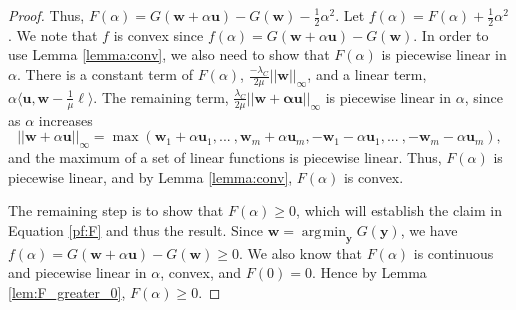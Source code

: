 \documentclass[10pt,a4paper]{amsart}
\DeclareMathOperator*{\argmin}{\arg\!\min}
\begin{document}
\begin{proof}
\noindent Thus, $F(\alpha) = G(\mathbf{w} + \alpha \mathbf{u}) - G(\mathbf{w}) - \frac{1}{2}\alpha^2$.  Let  $f(\alpha) = F(\alpha) + \frac{1}{2}\alpha^2$.  We note that $f$ is convex since $f(\alpha) = G(\mathbf{w} + \alpha \mathbf{u}) - G(\mathbf{w})$.  In order to use Lemma \ref{lemma:conv}, we also need to show that $F(\alpha)$ is piecewise linear in $\alpha$.  There is a constant term of $F(\alpha)$, $ \frac{-\lambda_C}{2\mu}|| \mathbf{w}||_\infty$, and a linear term, $\alpha \langle \mathbf{u}, \mathbf{w} - \frac{1}{\mu}\boldsymbol  \ell \rangle$.  The remaining term, $\frac{\lambda_C}{2\mu} ||\mathbf{w+\alpha\mathbf{u}}||_\infty$ is piecewise linear in $\alpha$, since as $\alpha$ increases
\[
||\mathbf{w} + \alpha \mathbf{u}||_\infty = \max(\mathbf{w}_1 + \alpha \mathbf{u}_1, ... \:, \mathbf{w}_m + \alpha \mathbf{u}_m, -\mathbf{w}_1 - \alpha \mathbf{u}_1, ... \:, -\mathbf{w}_m - \alpha \mathbf{u}_m), 
\]
and the maximum of a set of linear functions is piecewise linear.  Thus, $F(\alpha)$ is piecewise linear, and by Lemma \ref{lemma:conv}, $F(\alpha)$ is convex.  

The remaining step is to show that $F(\alpha) \geq 0$, which will establish the claim in Equation \ref{pf:F} and thus the result. 
 Since $\mathbf{w} = \argmin_{\mathbf{y}} G(\mathbf{y})$, we have $f(\alpha) = G(\mathbf{w} + \alpha \mathbf{u}) - G(\mathbf{w}) \geq 0$. We also know that $F(\alpha)$ is continuous and piecewise linear in $\alpha$, convex, and $F(0)=0$.  Hence by Lemma \ref{lem:F_greater_0}, $F(\alpha) \geq 0$.

\end{proof}
\end{document}
